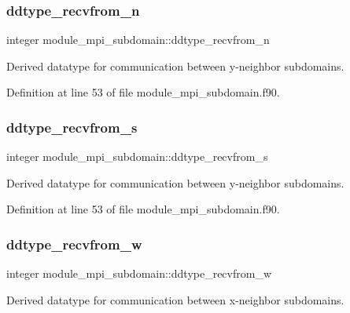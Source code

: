 \subsubsection{\texorpdfstring{ddtype\_recvfrom\_n}{ddtype\_recvfrom\_n}}
{\footnotesize\ttfamily integer module\+\_\+mpi\+\_\+subdomain\+::ddtype\+\_\+recvfrom\+\_\+n}



Derived datatype for communication between y-\/neighbor subdomains. 



Definition at line 53 of file module\+\_\+mpi\+\_\+subdomain.\+f90.

\mbox{\label{namespacemodule__mpi__subdomain_ada96687f5bacdbe6f66c542c7b9ec37b}} 
\subsubsection{\texorpdfstring{ddtype\_recvfrom\_s}{ddtype\_recvfrom\_s}}
{\footnotesize\ttfamily integer module\+\_\+mpi\+\_\+subdomain\+::ddtype\+\_\+recvfrom\+\_\+s}



Derived datatype for communication between y-\/neighbor subdomains. 



Definition at line 53 of file module\+\_\+mpi\+\_\+subdomain.\+f90.

\mbox{\label{namespacemodule__mpi__subdomain_a8422fcfc17adb1bdf04f2b7ca08003c2}} 
\subsubsection{\texorpdfstring{ddtype\_recvfrom\_w}{ddtype\_recvfrom\_w}}
{\footnotesize\ttfamily integer module\+\_\+mpi\+\_\+subdomain\+::ddtype\+\_\+recvfrom\+\_\+w}



Derived datatype for communication between x-\/neighbor subdomains. 




